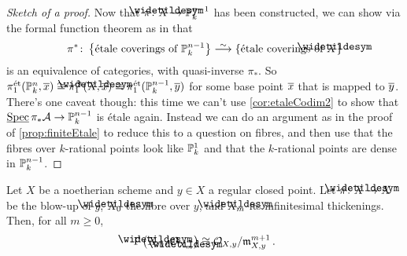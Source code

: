\begin{proof}[Sketch of a proof]
	Now that $\pi\colon \snake{X}\morphism \IP_k^{n-1}$ has been constructed, we can show via the formal function theorem as in  that
	\begin{equation*}
	\pi^*\colon\left\{\text{étale coverings of $\IP_k^{n-1}$}\right\}\isomorphism\left\{\text{étale coverings of $\snake{X}$}\right\}
	\end{equation*}
	is an equivalence of categories, with quasi-inverse $\pi_*$.
	So $\pi_1^\et(\IP_k^n,\ov{x})\cong \pi_1^\et(\snake{X},\ov{x})\cong \pi_1^\et(\IP_k^{n-1},\ov{y})$ for some base point $\ov{x}$ that is mapped to $\ov{y}$. There's one caveat though: this time we can't use \cref{cor:etaleCodim2} to show that $\SPEC\pi_*\Aa\morphism \IP_k^{n-1}$ is étale again. Instead we can do an argument as in the proof of \cref{prop:finiteEtale} to reduce this to a question on fibres, and then use that the fibres over $k$-rational points look like $\mathbb{P}_k^1$ and that the $k$-rational points are dense in $\mathbb{P}_k^{n-1}$.
\end{proof}
\begin{lem*}\label{lem*:thickenedFibres}
	Let $X$ be a noetherian scheme and $y\in X$ a regular closed point. Let $\pi\colon \snake{X}\morphism X$ be the blow-up of $y$, $\snake{X}_0$ the fibre over $y$, and $\snake{X}_m$ its infinitesimal thickenings. Then, for all $m\geq 0$,
	\begin{equation*}
		\Global\big(\snake{X}_m,\Oo_{\snake{X}_m}\big)\cong \Oo_{X,y}/\mm_{X,y}^{m+1}\,.
	\end{equation*}
\end{lem*}
